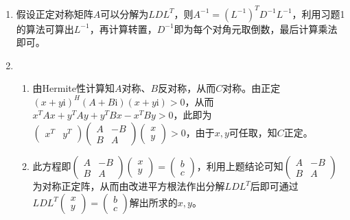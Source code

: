 \documentclass[a4paper,UTF8,fontset=windows]{ctexart}
\begin{document}
\begin{enumerate}
\item
假设正定对称矩阵$A$可以分解为$LDL^T$，则$A^{-1}=(L^{-1})^TD^{-1}L^{-1}$，利用习题1的算法可算出$L^{-1}$，再计算转置，$D^{-1}$即为每个对角元取倒数，最后计算乘法即可。

\item
\begin{enumerate}[(1)]
\item
由Hermite性计算知$A$对称、$B$反对称，从而$C$对称。由正定$(x+y\mathrm{i})^H(A+B\mathrm{i})(x+y\mathrm{i})>0$，从而$x^TAx+y^TAy+y^TBx-x^TBy>0$，此即为$\begin{pmatrix}x^T&y^T\end{pmatrix}\begin{pmatrix}A&-B\\B&A\end{pmatrix}\begin{pmatrix}x\\y\end{pmatrix}>0$，由于$x,y$可任取，知$C$正定。

\item
此方程即$\begin{pmatrix}A&-B\\B&A\end{pmatrix}\begin{pmatrix}x\\y\end{pmatrix}=\begin{pmatrix}b\\c\end{pmatrix}$，利用上题结论可知$\begin{pmatrix}A&-B\\B&A\end{pmatrix}$为对称正定阵，从而由改进平方根法作出分解$LDL^T$后即可通过$LDL^T\begin{pmatrix}x\\y\end{pmatrix}=\begin{pmatrix}b\\c\end{pmatrix}$解出所求的$x,y$。
\end{enumerate}
\end{enumerate}
\end{document}
